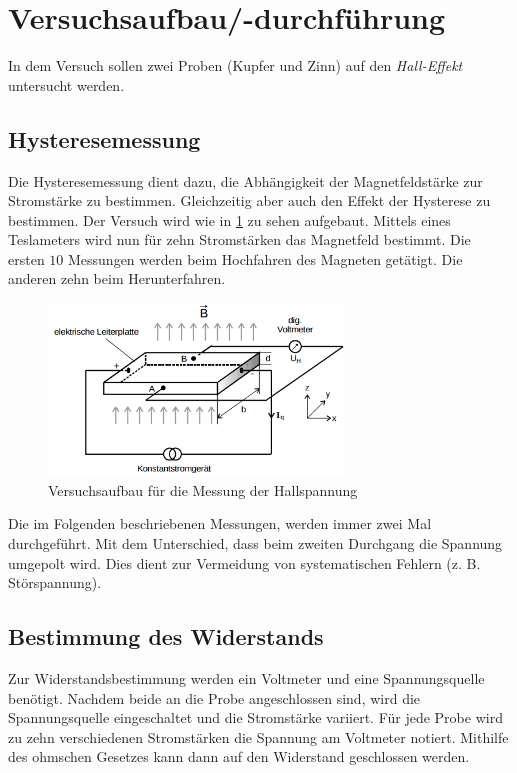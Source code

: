 \section{Versuchsaufbau/-durchführung}
In dem Versuch sollen zwei Proben (Kupfer und Zinn) auf den \emph{Hall-Effekt} untersucht werden.

\subsection{Hysteresemessung}
Die Hysteresemessung dient dazu, die Abhängigkeit der Magnetfeldstärke 
zur Stromstärke zu bestimmen. Gleichzeitig aber auch den Effekt der Hysterese
zu bestimmen. Der Versuch wird wie in \ref{fig: auf_hall} zu sehen aufgebaut.
Mittels eines Teslameters wird nun für zehn Stromstärken das Magnetfeld bestimmt.
Die ersten $10$ Messungen werden beim Hochfahren des Magneten getätigt.
Die anderen zehn beim Herunterfahren.

\begin{figure}
  \centering
  \includegraphics[width=0.7\textwidth]{pics/Halleffekt_aufbau.png}
  \caption{Versuchsaufbau für die Messung der Hallspannung}
  \label{fig: auf_hall}
\end{figure}

\begin{center}
Die im Folgenden beschriebenen Messungen, werden immer zwei Mal durchgeführt.
Mit dem Unterschied, dass beim zweiten Durchgang die Spannung umgepolt wird.
Dies dient zur Vermeidung von systematischen Fehlern (z. B. Störspannung).
\end{center}

\subsection{Bestimmung des Widerstands}
Zur Widerstandsbestimmung werden ein Voltmeter und 
eine Spannungsquelle benötigt.
Nachdem beide an die Probe angeschlossen sind, 
wird die Spannungsquelle eingeschaltet und die Stromstärke variiert. 
Für jede Probe wird zu zehn verschiedenen Stromstärken 
die Spannung am Voltmeter notiert.
Mithilfe des ohmschen Gesetzes kann dann auf den Widerstand geschlossen werden.

